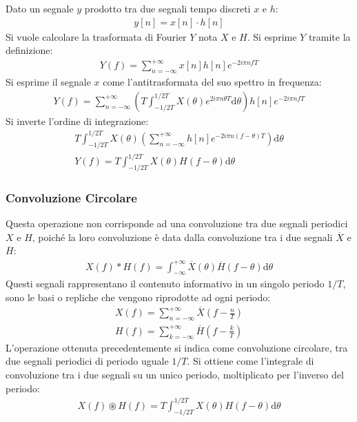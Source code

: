 \documentclass{article}
\newcommand{\df}{\mathrm{d}}
\numberwithin{equation}{subsection}
\begin{document}
Dato un segnale $y$ prodotto tra due segnali tempo discreti $x$ e $h$:
\begin{gather*}
    y[n]=x[n]\cdot h[n]
\end{gather*}
Si vuole calcolare la trasformata di Fourier $Y$ nota $X$ e $H$. Si esprime $Y$ tramite la definizione:
\begin{gather*}
    Y(f)=\displaystyle\sum_{n=-\infty}^{+\infty}x[n]h[n]e^{-2i\pi nfT}
\end{gather*}
Si esprime il segnale $x$ come l'antitrasformata del suo spettro in frequenza: 
\begin{gather*}
    Y(f)=\displaystyle\sum_{n=-\infty}^{+\infty}\left(T\int_{-1/2T}^{1/2T}X(\theta)e^{2i\pi n\theta T}\df\theta\right)h[n]e^{-2i\pi nfT}
\end{gather*}
Si inverte l'ordine di integrazione:
\begin{gather*}
    T\int_{-1/2T}^{1/2T}X(\theta)\left(\sum_{n=-\infty}^{+\infty}h[n]e^{-2i\pi n(f-\theta)T}\right)\df\theta\\
    Y(f)=\displaystyle T\int_{-1/2T}^{1/2T}X(\theta)H(f-\theta)\df\theta
\end{gather*}

\subsubsection{Convoluzione Circolare}

Questa operazione non corrisponde ad una convoluzione tra due segnali periodici $X$ e $H$, poiché la loro convoluzione è data dalla 
convoluzione tra i due segnali $\overline{X}$ e $\overline{H}$:
\begin{gather}
    {X}(f)*{H}(f)=\displaystyle\int_{-\infty}^{+\infty}\overline{X}(\theta)\overline{H}(f-\theta)\df\theta
\end{gather}
Questi segnali rappresentano il contenuto informativo in un singolo periodo $1/T$, sono  le basi o repliche che vengono riprodotte ad ogni periodo:
\begin{gather*}
    X(f)=\displaystyle\sum_{n=-\infty}^{+\infty}\overline{X}\left(f-\frac{n}{T}\right)\\
    H(f)=\displaystyle\sum_{k=-\infty}^{+\infty}\overline{H}\left(f-\frac{k}{T}\right)
\end{gather*}
L'operazione ottenuta precedentemente si indica come convoluzione circolare, tra due segnali periodici di periodo uguale $1/T$. Si ottiene come l'integrale 
di convoluzione tra i due segnali su un unico periodo, moltiplicato per l'inverso del periodo:
\begin{gather}
    X(f) \circledast H(f)=\displaystyle T\int_{-1/2T}^{1/2T}X(\theta)H(f-\theta)\df\theta
\end{gather}
\end{document}
